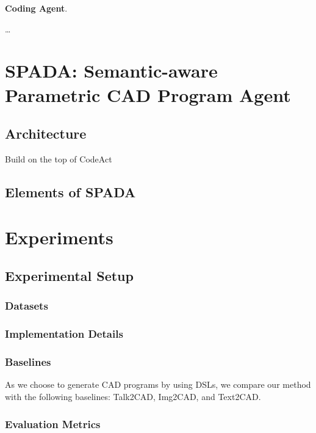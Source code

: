 \documentclass[letterpaper]{article} %
\begin{document}
\textbf{Coding Agent}.


…
\section{SPADA: Semantic-aware Parametric CAD Program Agent}

\subsection{Architecture} %

Build on the top of CodeAct

\subsection{Elements of SPADA} %

\textbf{}



\section{Experiments}

\subsection{Experimental Setup}

\subsubsection{Datasets}

\subsubsection{Implementation Details}

\subsubsection{Baselines}

As we choose to generate CAD programs by using DSLs, we compare our method with the following baselines: Talk2CAD, Img2CAD, and Text2CAD.

\subsubsection{Evaluation Metrics}
\end{document}
